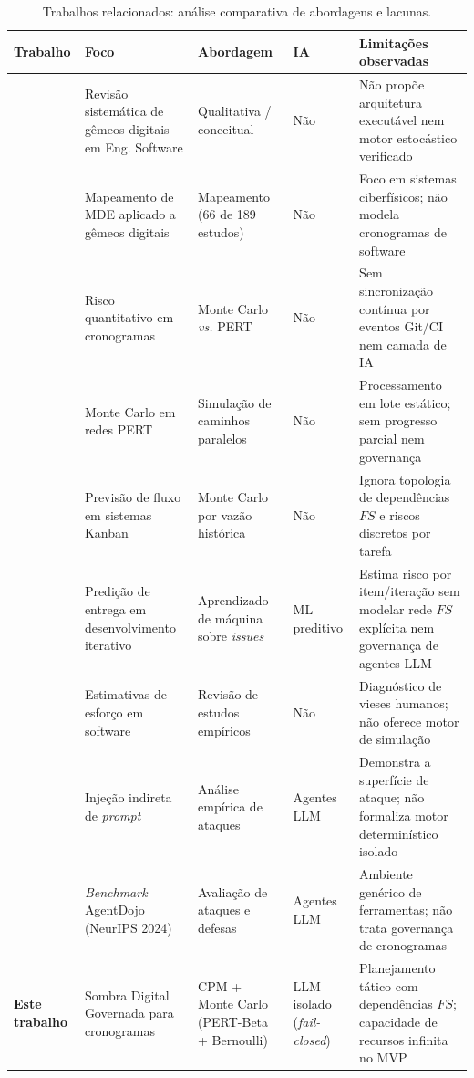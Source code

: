 \documentclass[12pt,openany,oneside,a4paper,english,brazilian,sumario=tradicional]{abntex2}
\newcommand{\fonteautores}{\par\vspace{1mm}{\small Fonte: Elaborado pelos autores (2026).}}
\begin{document}
\begin{table}[htbp]
\caption{Trabalhos relacionados: análise comparativa de abordagens e lacunas.}\label{tab:relacionados}
{\scriptsize
\setlength{\tabcolsep}{3pt}
\begin{tabularx}{\textwidth}{L{2.2cm} L{2.4cm} L{2.4cm} L{1.7cm} Y}
\toprule
\textbf{Trabalho} & \textbf{Foco} & \textbf{Abordagem} & \textbf{IA} & \textbf{Limitações observadas}\\
\midrule
{} & Revisão sistemática de gêmeos digitais em Eng. Software & Qualitativa / conceitual & Não & Não propõe arquitetura executável nem motor estocástico verificado\\
 & Mapeamento de MDE aplicado a gêmeos digitais & Mapeamento (66 de 189 estudos) & Não & Foco em sistemas ciberfísicos; não modela cronogramas de software\\
 & Risco quantitativo em cronogramas & Monte Carlo \textit{vs.} PERT & Não & Sem sincronização contínua por eventos Git/CI nem camada de IA\\
 & Monte Carlo em redes PERT & Simulação de caminhos paralelos & Não & Processamento em lote estático; sem progresso parcial nem governança\\
 & Previsão de fluxo em sistemas Kanban & Monte Carlo por vazão histórica & Não & Ignora topologia de dependências $FS$ e riscos discretos por tarefa\\
 & Predição de entrega em desenvolvimento iterativo & Aprendizado de máquina sobre \textit{issues} & ML preditivo & Estima risco por item/iteração sem modelar rede $FS$ explícita nem governança de agentes LLM\\
 & Estimativas de esforço em software & Revisão de estudos empíricos & Não & Diagnóstico de vieses humanos; não oferece motor de simulação\\
 & Injeção indireta de \textit{prompt} & Análise empírica de ataques & Agentes LLM & Demonstra a superfície de ataque; não formaliza motor determinístico isolado\\
 & \textit{Benchmark} AgentDojo (NeurIPS 2024) & Avaliação de ataques e defesas & Agentes LLM & Ambiente genérico de ferramentas; não trata governança de cronogramas\\
\textbf{Este trabalho} & Sombra Digital Governada para cronogramas & CPM + Monte Carlo (PERT-Beta + Bernoulli) & LLM isolado (\textit{fail-closed}) & Planejamento tático com dependências $FS$; capacidade de recursos infinita no MVP\\
\bottomrule
\end{tabularx}}
\fonteautores
\end{table}
\end{document}
